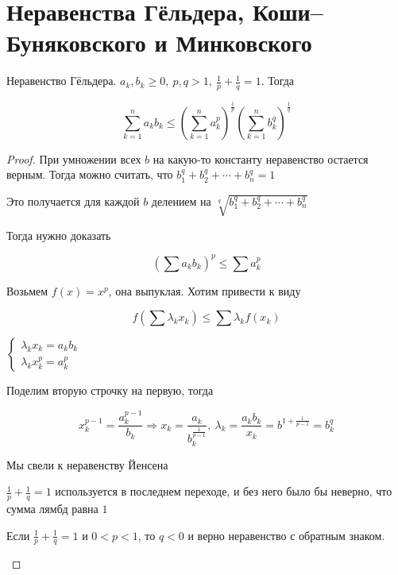 \section{Неравенства Гёльдера, Коши–Буняковского и Минковского \href{https://youtu.be/p9C57KDo1Yg?t=1407}{\Walley}}

\begin{theorem-non}
    Неравенство Гёльдера. 
    $a_k, b_k \geqslant 0,\ p, q > 1,\ \frac{1}{p}+\frac{1}{q} = 1$. Тогда
    
    \[ \sum_{k=1}^{n} a_k b_k \leqslant \left( \sum_{k=1}^{n} a_k^p\right)^\frac{1}{p} \left( \sum_{k=1}^{n} b_k^q\right)^\frac{1}{q} \]
\end{theorem-non}

\begin{proof}
    При умножении всех $b$ на какую-то константу неравенство остается верным. Тогда можно считать, что $b_1^q+b_2^q+\cdots+b_n^q=1$

    Это получается для каждой $b$ делением на $\sqrt[q]{b_1^q+b_2^q+\cdots+b_n^q}$

    Тогда нужно доказать

    \[ \left(\sum a_k b_k \right)^p \leqslant \sum a_k^p \]

    Возьмем $f(x) = x^p$, она выпуклая. Хотим привести к виду

    \[ f(\sum \lambda_k x_k) \leqslant \sum \lambda_k f(x_k) \]

    $
    \begin{cases}
        \lambda_k x_k = a_k b_k \\
        \lambda_k x_k^p = a_k^p
    \end{cases}
    $

    Поделим вторую строчку на первую, тогда

    \[ x_k^{p-1} = \frac{a_k^{p-1}}{b_k} \Rightarrow x_k = \frac{a_k}{b_k^{\frac{1}{p-1}}},\ 
    \lambda_k = \frac{a_k b_k}{x_k} = b^{1+\frac{1}{p-1}} = b_k^q\]

    Мы свели к неравенству Йенсена

    $\frac{1}{p}+\frac{1}{q} = 1$ используется в последнем переходе, и без него было бы неверно, что сумма лямбд равна $1$

    \begin{notice}
        Если $\frac{1}{p}+\frac{1}{q} = 1$ и $0 < p < 1$, то $q < 0$ и верно неравенство с обратным знаком.
    \end{notice}
\end{proof}

